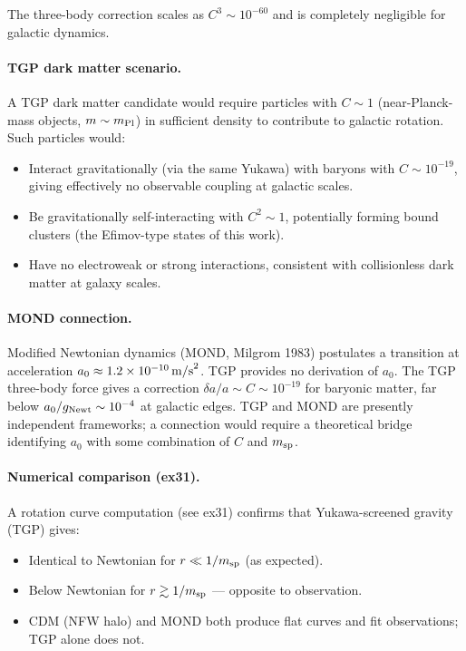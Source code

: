 The three-body correction scales as $C^3\sim10^{-60}$ and is
completely negligible for galactic dynamics.

\paragraph{TGP dark matter scenario.}
A TGP dark matter candidate would require particles with
$C\sim1$ (near-Planck-mass objects, $m\sim m_{\rm Pl}$) in sufficient
density to contribute to galactic rotation.  Such particles would:
\begin{itemize}
\item Interact gravitationally (via the same Yukawa) with baryons
  with $C\sim10^{-19}$, giving effectively no observable coupling
  at galactic scales.
\item Be gravitationally self-interacting with $C^2\sim1$, potentially
  forming bound clusters (the Efimov-type states of this work).
\item Have no electroweak or strong interactions, consistent with
  collisionless dark matter at galaxy scales.
\end{itemize}

\paragraph{MOND connection.}
Modified Newtonian dynamics (MOND, Milgrom 1983) postulates a
transition at acceleration $a_0\approx1.2\times10^{-10}\,{\rm m/s}^2$.
TGP provides no derivation of $a_0$.  The TGP three-body force
gives a correction $\delta a/a\sim C\sim10^{-19}$ for baryonic matter,
far below $a_0/g_{\rm Newt}\sim10^{-4}$ at galactic edges.
TGP and MOND are presently independent frameworks; a connection would
require a theoretical bridge identifying $a_0$ with some combination
of $C$ and $m_{\rm sp}$.

\paragraph{Numerical comparison (ex31).}
A rotation curve computation (see ex31) confirms that Yukawa-screened
gravity (TGP) gives:
\begin{itemize}
\item Identical to Newtonian for $r\ll1/m_{\rm sp}$ (as expected).
\item Below Newtonian for $r\gtrsim1/m_{\rm sp}$ — opposite to observation.
\item CDM (NFW halo) and MOND both produce flat curves and fit
  observations; TGP alone does not.
\end{itemize}

